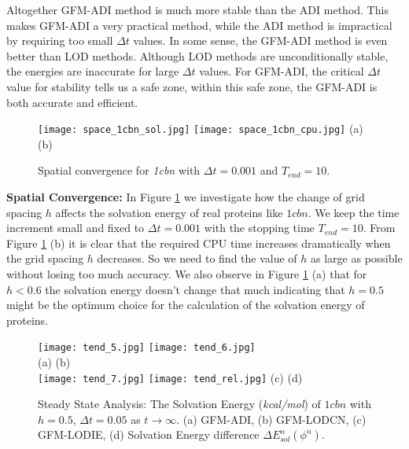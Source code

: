 Altogether GFM-ADI method is much more stable than the ADI method. This makes GFM-ADI a very practical method, while the ADI method is impractical by requiring too small $\Delta t$ values. In some sense, the GFM-ADI method is even better than LOD methods. Although LOD methods are unconditionally stable, the energies are inaccurate for large $\Delta t$ values. For GFM-ADI, the critical $\Delta t$ value for stability tells us a safe zone, within this safe zone, the GFM-ADI is both accurate and efficient. 

\begin{figure}[!t]
	\begin{center}
	\texttt{[image: space\_1cbn\_sol.jpg]}
	\texttt{[image: space\_1cbn\_cpu.jpg]}	
	(a)\hspace*{3in} (b)\\ 
	\end{center}
	\caption{Spatial convergence for \textit{1cbn} with $\Delta t = 0.001$ and $T_{end} = 10$.}
	\label{fig:space_1cbn}
\end{figure}

{\bf Spatial Convergence:} In Figure \ref{fig:space_1cbn} we investigate how the change of grid spacing $h$ affects the solvation energy of real proteins like $1cbn$. We keep the time increment small and fixed to $ \Delta t = 0.001$ with the stopping time $T_{end} = 10$. From Figure \ref{fig:space_1cbn} (b) it is clear that the required CPU time increases dramatically when the grid spacing $h$ decreases. So we need to find the value of $h$ as large as possible without losing too much accuracy. We also observe in Figure \ref{fig:space_1cbn} (a) that for $h<0.6$ the solvation energy doesn't change that much indicating that $h = 0.5$ might be the optimum choice for the calculation of the solvation energy of proteins. 

\begin{figure}[!t]
	\centering
	\texttt{[image: tend\_5.jpg]}
	\texttt{[image: tend\_6.jpg]}\\
	(a)\hspace*{3in} (b)\\ 
	\texttt{[image: tend\_7.jpg]}
	\texttt{[image: tend\_rel.jpg]}
	(c)\hspace*{3in} (d)
	\caption{Steady State Analysis: The Solvation Energy (\textit{kcal/mol}) of $1cbn$ with $h=0.5$, $\Delta t = 0.05$ as $t\rightarrow \infty$. (a) GFM-ADI, (b) GFM-LODCN, (c) GFM-LODIE, (d) Solvation Energy difference  $\Delta E^n_{sol}(\phi^n)$.}
	\label{fig:tend}
\end{figure}


